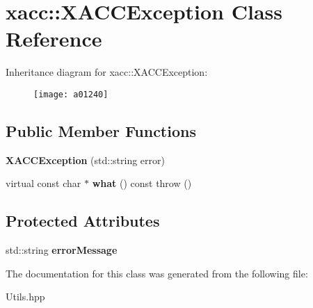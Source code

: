 \hypertarget{a01240}{}\section{xacc\+:\+:X\+A\+C\+C\+Exception Class Reference}
\label{a01240}
Inheritance diagram for xacc\+:\+:X\+A\+C\+C\+Exception\+:\begin{figure}[H]
\begin{center}
\leavevmode
\texttt{[image: a01240]}
\end{center}
\end{figure}
\subsection*{Public Member Functions}
\begin{DoxyCompactItemize}
\item 
\mbox{\label{a01240_ab62415ce6e1dd25fb1a074f5741007c9}} 
{\bfseries X\+A\+C\+C\+Exception} (std\+::string error)
\item 
\mbox{\label{a01240_a86612df9215beec1933229c5dddc12e5}} 
virtual const char $\ast$ {\bfseries what} () const  throw ()
\end{DoxyCompactItemize}
\subsection*{Protected Attributes}
\begin{DoxyCompactItemize}
\item 
\mbox{\label{a01240_a31f64c6fb215570571b9b4a3d47eadd0}} 
std\+::string {\bfseries error\+Message}
\end{DoxyCompactItemize}


The documentation for this class was generated from the following file\+:\begin{DoxyCompactItemize}
\item 
Utils.\+hpp\end{DoxyCompactItemize}

